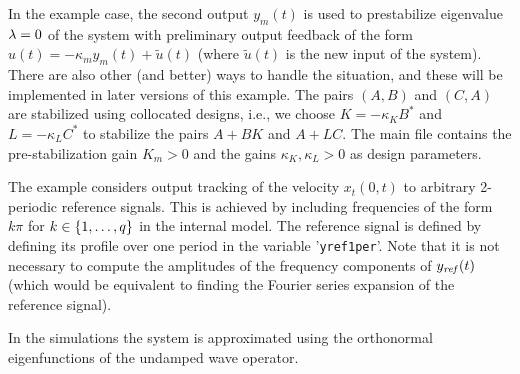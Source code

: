 \documentclass[11pt, a4paper]{amsart}
\theoremstyle{definition}
\numberwithin{equation}{section}
\newcommand{\yref}{y_{\mbox{\scriptsize\textit{ref}}}}
\newcommand{\wdist}{w_{\mbox{\scriptsize\textit{dist}}}}
\begin{document}
    In the example case, the second output $y_m(t)$ is used to prestabilize eigenvalue $\lambda=0$ of the system with preliminary output feedback of the form $u(t)=-\kappa_m y_m(t)+\tilde{u}(t)$ (where $\tilde{u}(t)$ is the new input of the system). There are also other (and better) ways to handle the situation, and these will be implemented in later versions of this example. 
    The pairs $(A,B)$ and $(C,A)$ are stabilized using collocated designs, i.e., we choose $K=-\kappa_K B^\ast$ and $L=-\kappa_L C^\ast$ to stabilize the pairs $A+BK$ and $A+LC$.
    The main file contains the pre-stabilization gain $K_m>0$ and the gains $\kappa_K,\kappa_L>0$ as design parameters.

    The example considers output tracking of the velocity $x_t(0,t)$ to arbitrary 2-periodic reference signals. This is achieved by including  frequencies of the form $k\pi$ for $k\in \{1,\ldots,q\}$ in the internal model.  The reference signal is defined by defining its profile over one period in the  variable '\texttt{yref1per}'. Note that it is not necessary to compute the amplitudes of the frequency components of $\yref(t)$ (which would be equivalent to finding the Fourier series  expansion of the reference signal).

In the simulations the system is approximated using the orthonormal eigenfunctions of the undamped wave operator.


%
\end{document}
